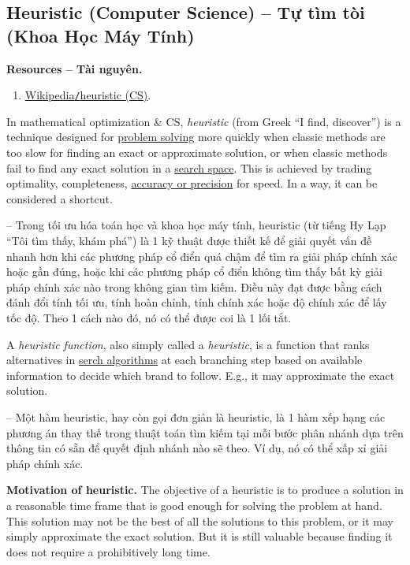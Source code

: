 \documentclass{article}
\begin{document}
\subsection{Heuristic (Computer Science) -- Tự tìm tòi (Khoa Học Máy Tính)}
\textbf{\textbf{Resources -- Tài nguyên.}}
\begin{enumerate}
	\item \href{https://en.wikipedia.org/wiki/Heuristic_(computer_science)}{Wikipedia{\tt/}heuristic (CS)}.
\end{enumerate}
In mathematical optimization \& CS, {\it heuristic} (from Greek ``I find, discover'') is a technique designed for \href{https://en.wikipedia.org/wiki/Problem_solving}{problem solving} more quickly when classic methods are too slow for finding an exact or approximate solution, or when classic methods fail to find any exact solution in a \href{https://en.wikipedia.org/wiki/Space_complexity}{search space}. This is achieved by trading optimality, completeness, \href{https://en.wikipedia.org/wiki/Accuracy_and_precision}{accuracy or precision} for speed. In a way, it can be considered a shortcut.

-- Trong tối ưu hóa toán học và khoa học máy tính, heuristic (từ tiếng Hy Lạp ``Tôi tìm thấy, khám phá'') là 1 kỹ thuật được thiết kế để giải quyết vấn đề nhanh hơn khi các phương pháp cổ điển quá chậm để tìm ra giải pháp chính xác hoặc gần đúng, hoặc khi các phương pháp cổ điển không tìm thấy bất kỳ giải pháp chính xác nào trong không gian tìm kiếm. Điều này đạt được bằng cách đánh đổi tính tối ưu, tính hoàn chỉnh, tính chính xác hoặc độ chính xác để lấy tốc độ. Theo 1 cách nào đó, nó có thể được coi là 1 lối tắt.

A {\it heuristic function}, also simply called a {\it heuristic}, is a function that ranks alternatives in \href{https://en.wikipedia.org/wiki/Search_algorithm}{serch algorithms} at each branching step based on available information to decide which brand to follow. E.g., it may approximate the exact solution.

-- Một hàm heuristic, hay còn gọi đơn giản là heuristic, là 1 hàm xếp hạng các phương án thay thế trong thuật toán tìm kiếm tại mỗi bước phân nhánh dựa trên thông tin có sẵn để quyết định nhánh nào sẽ theo. Ví dụ, nó có thể xấp xỉ giải pháp chính xác.

{\bf Motivation of heuristic.} The objective of a heuristic is to produce a solution in a reasonable time frame that is good enough for solving the problem at hand. This solution may not be the best of all the solutions to this problem, or it may simply approximate the exact solution. But it is still valuable because finding it does not require a prohibitively long time.
\end{document}
